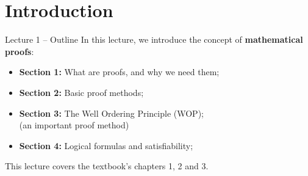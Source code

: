 \section{Introduction}

\begin{frame}{Lecture 1 -- Outline}
  In this lecture, we introduce the concept of {\bf mathematical proofs}:\bigskip

  \begin{itemize}
    \item {\bf Section 1:} What are proofs, and why we need them;
    \item {\bf Section 2:} Basic proof methods;
    \item {\bf Section 3:} The Well Ordering Principle (WOP);\\
    (an important proof method)
    \item {\bf Section 4:} Logical formulas and satisfiability;
  \end{itemize}


  \bigskip
  \begin{block}{}
  This lecture covers the textbook's chapters 1, 2 and 3.
  \end{block}
\end{frame}
